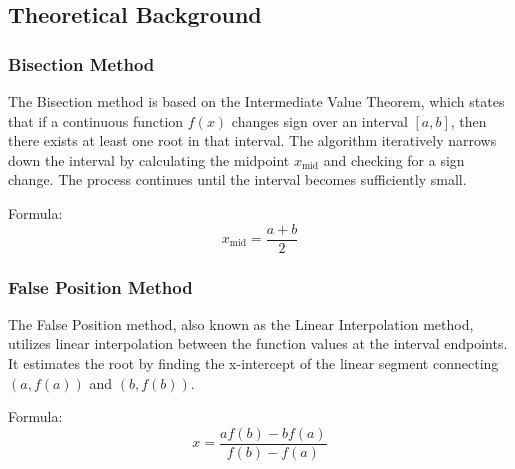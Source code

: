 \documentclass{article}
\begin{document}
\subsection*{Theoretical Background}

\subsubsection*{Bisection Method}
The Bisection method is based on the Intermediate Value Theorem, which states that if a continuous function $ f(x) $ changes sign over an interval $ [a, b] $, then there exists at least one root in that interval. The algorithm iteratively narrows down the interval by calculating the midpoint $ x_{\text{mid}} $ and checking for a sign change. The process continues until the interval becomes sufficiently small.

Formula:
\[ x_{\text{mid}} = \frac{a + b}{2} \]

\subsubsection*{False Position Method}
The False Position method, also known as the Linear Interpolation method, utilizes linear interpolation between the function values at the interval endpoints. It estimates the root by finding the x-intercept of the linear segment connecting $ (a, f(a)) $ and $ (b, f(b)) $.

Formula:
\[ x = \frac{af(b) - bf(a)}{f(b) - f(a)} \]
\end{document}
